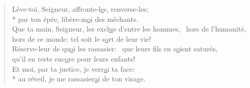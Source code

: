 \begin{verse}
Lève-toi, Seigneur, affronte-l\underline{e}s, renverse-les; \\*
par ton épée, libère-m\underline{o}i des méchants. \\

Que ta main, Seigneur, les excl\underline{u}e d’entre les hommes,~\psalmstar
hors de l’humanité, hors de ce monde:
tel soit le s\underline{o}rt de leur vie! \\

Réserve-leur de qu\underline{o}i les rassasier:~\psalmdagger
que leurs fils en s\underline{o}ient saturés, \\
qu’il en reste enc\underline{o}re pour leurs enfants! \\

Et moi, par ta justice, je verr\underline{a}i ta face: \\*
au réveil, je me rassasier\underline{a}i de ton visage. \\
\end{verse}

